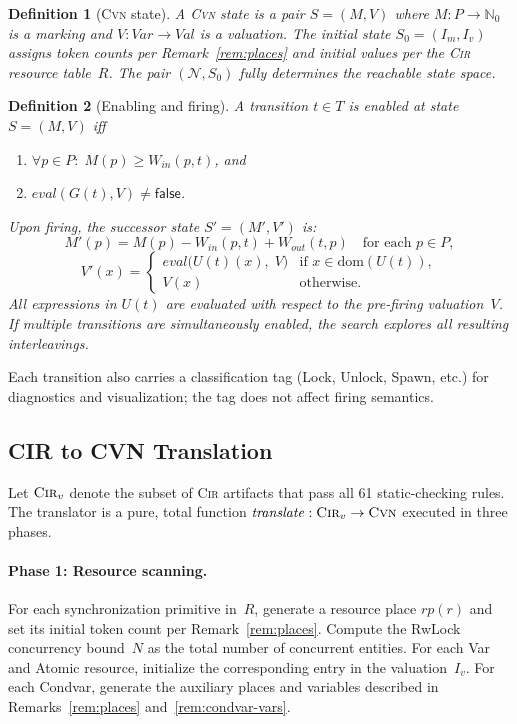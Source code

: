 \documentclass[sigconf]{acmart}
\newtheorem{definition}{Definition}
\begin{document}
\begin{definition}[\textsc{Cvn} state]
\label{def:cvn-state}
A \textsc{Cvn} state is a pair $S=(M,V)$ where $M:P\to\mathbb{N}_0$ is a marking and $V:\mathit{Var}\to\mathit{Val}$ is a valuation. The initial state $S_0=(I_m,I_v)$ assigns token counts per Remark~\ref{rem:places} and initial values per the \textsc{Cir} resource table~$R$. The pair $(\mathcal{N},S_0)$ fully determines the reachable state space.
\end{definition}

\begin{definition}[Enabling and firing]
\label{def:enabling-firing}
A transition $t\in T$ is \emph{enabled} at state $S=(M,V)$ iff
\begin{enumerate}
  \item $\forall p\in P:\; M(p)\geq W_{\!\mathit{in}}(p,t)$, and
  \item $\mathit{eval}(G(t),V)\neq\mathsf{false}$.
\end{enumerate}
Upon firing, the successor state $S'=(M',V')$ is:
\[
  M'(p)=M(p)-W_{\!\mathit{in}}(p,t)+W_{\!\mathit{out}}(t,p)
  \quad\text{for each }p\in P,
\]
\[
  V'(x)=
  \begin{cases}
    \mathit{eval}\bigl(U(t)(x),\;V\bigr)
      & \text{if } x\in\mathrm{dom}(U(t)),\\
    V(x) & \text{otherwise.}
  \end{cases}
\]
All expressions in $U(t)$ are evaluated with respect to the pre-firing valuation~$V$.
If multiple transitions are simultaneously enabled, the search explores all resulting interleavings.
\end{definition}

Each transition also carries a classification tag (Lock, Unlock, Spawn, etc.) for diagnostics and visualization; the tag does not affect firing semantics.


\subsection{CIR to CVN Translation}
\label{subsec:translation}


Let $\textsc{Cir}_v$ denote the subset of \textsc{Cir} artifacts that pass all 61 static-checking rules. The translator is a pure, total function $\mathit{translate}:\textsc{Cir}_v\to\textsc{Cvn}$
executed in three phases.

\paragraph{Phase 1: Resource scanning.}
For each synchronization primitive in~$R$, generate a resource place $\mathit{rp}(r)$ and set its initial token count per Remark~\ref{rem:places}. Compute the RwLock concurrency bound~$N$ as the total number of concurrent entities. For each \textsf{Var} and \textsf{Atomic} resource, initialize the corresponding entry in the valuation~$I_v$. For each \textsf{Condvar}, generate the auxiliary places and variables described in Remarks~\ref{rem:places} and~\ref{rem:condvar-vars}.
\end{document}
